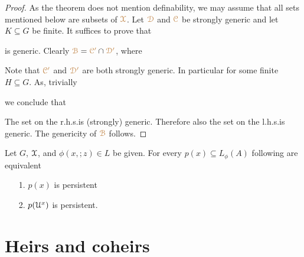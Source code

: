\begin{proof}
  As the theorem does not mention definability, we may assume that all sets mentioned below are subsets of ${\color{brown}\EuScript X}$.
  Let ${\color{brown}\EuScript D}$ and ${\color{brown}\EuScript C}$ be strongly generic and let $K\subseteq G$ be finite.
  It suffices to prove that 
  

  is generic. 
  Clearly ${\color{brown}\EuScript B}={\color{brown}\EuScript C'}\cap{\color{brown}\EuScript D'}$, where
  

  Note that ${\color{brown}\EuScript C'}$ and ${\color{brown}\EuScript D'}$ are both strongly generic.
  In particular  for some finite $H\subseteq G$.
  As, trivially


  we conclude that
  

  The set on the r.h.s.\@ is (strongly) generic.
  Therefore also the set on the l.h.s.\@ is generic.
  The genericity of ${\color{brown}\EuScript B}$ follows.
\end{proof}

\begin{exercise}\label{ex_persistent_types}
  Let $G$, $\EuScript X$, and $\phi(x,;z)\in L$ be given.
  For every $p(x)\subseteq L_\phi(A)$ following are equivalent
  \begin{itemize}
    \item[1.] $p(x)$ is persistent
    \item[2.] $p(\EuScript U^x)$ is persistent.
  \end{itemize}
\end{exercise}

\section{Heirs and coheirs}
\label{coheirs}

\def\medrel#1{\parbox[t]{6ex}{$\displaystyle\hfil #1$}}
\def\ceq#1#2#3{\parbox[t]{16ex}{$\displaystyle #1$}\medrel{#2}{$\displaystyle #3$}}

